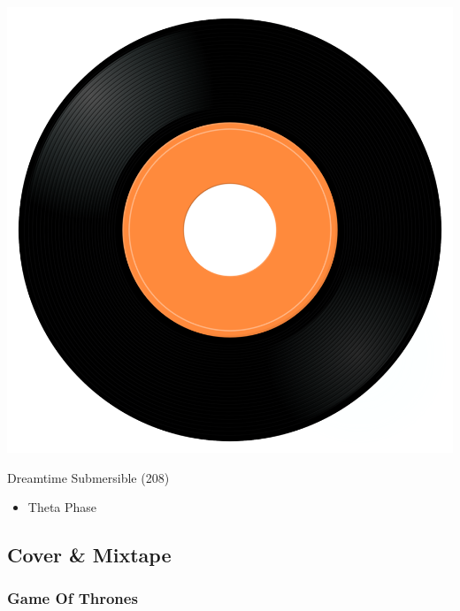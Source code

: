 \begin{minipage}[t]{0.25\textwidth}\vspace{0pt}
\captionsetup{type=figure}
\includegraphics[width=\textwidth]{Images/cover.png}
\caption*{Dreamtime Submersible (208)}
\end{minipage}
\begin{minipage}[t]{0.25\textwidth}\vspace{0pt}
\begin{itemize}[nosep,leftmargin=1em,labelwidth=*,align=left]
	\setlength{\itemsep}{0pt}
	\item Theta Phase
\end{itemize}
\end{minipage}


\subsection{Cover \& Mixtape}

\subsubsection{Game Of Thrones}

